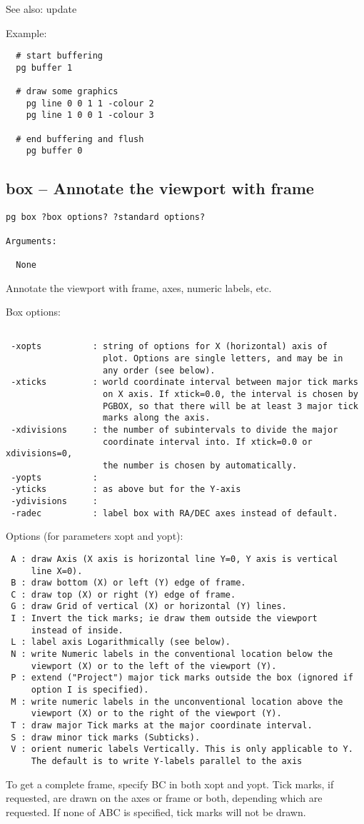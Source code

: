 See also: update

Example:
\begin{verbatim}
  # start buffering
  pg buffer 1

  # draw some graphics
    pg line 0 0 1 1 -colour 2
    pg line 1 0 0 1 -colour 3

  # end buffering and flush
    pg buffer 0
\end{verbatim}

\subsection{box -- Annotate the viewport with frame}
\begin{verbatim}
pg box ?box options? ?standard options?

Arguments:

  None
\end{verbatim}
Annotate the viewport with frame, axes, numeric labels, etc.

Box options:
\begin{verbatim}

 -xopts          : string of options for X (horizontal) axis of
                   plot. Options are single letters, and may be in
                   any order (see below).
 -xticks         : world coordinate interval between major tick marks
                   on X axis. If xtick=0.0, the interval is chosen by
                   PGBOX, so that there will be at least 3 major tick
                   marks along the axis.
 -xdivisions     : the number of subintervals to divide the major
                   coordinate interval into. If xtick=0.0 or xdivisions=0,
                   the number is chosen by automatically.
 -yopts          :
 -yticks         : as above but for the Y-axis
 -ydivisions     :
 -radec          : label box with RA/DEC axes instead of default.
\end{verbatim}

Options (for parameters xopt and yopt):
\begin{verbatim}
 A : draw Axis (X axis is horizontal line Y=0, Y axis is vertical
     line X=0).
 B : draw bottom (X) or left (Y) edge of frame.
 C : draw top (X) or right (Y) edge of frame.
 G : draw Grid of vertical (X) or horizontal (Y) lines.
 I : Invert the tick marks; ie draw them outside the viewport
     instead of inside.
 L : label axis Logarithmically (see below).
 N : write Numeric labels in the conventional location below the
     viewport (X) or to the left of the viewport (Y).
 P : extend ("Project") major tick marks outside the box (ignored if
     option I is specified).
 M : write numeric labels in the unconventional location above the
     viewport (X) or to the right of the viewport (Y).
 T : draw major Tick marks at the major coordinate interval.
 S : draw minor tick marks (Subticks).
 V : orient numeric labels Vertically. This is only applicable to Y.
     The default is to write Y-labels parallel to the axis
\end{verbatim}
To get a complete frame, specify BC in both xopt and yopt.
Tick marks, if requested, are drawn on the axes or frame
or both, depending which are requested. If none of ABC is specified,
tick marks will not be drawn. 

